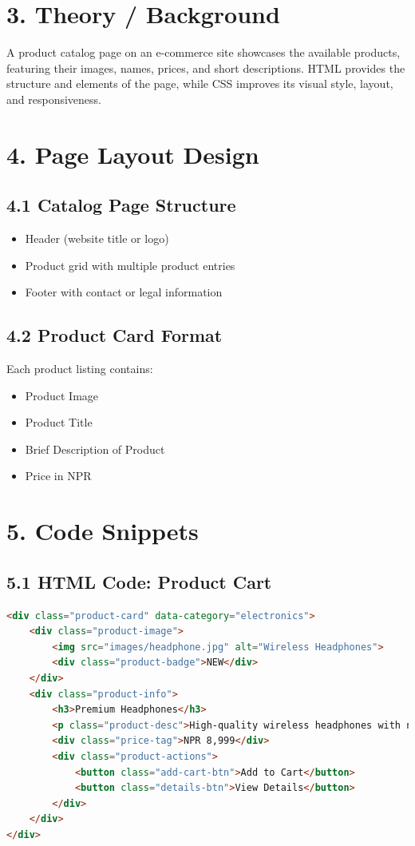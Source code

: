 \documentclass[a4paper,12pt]{article}
\begin{document}
\section*{3. Theory / Background}
A product catalog page on an e-commerce site showcases the available products, featuring their images, names, prices, and short descriptions. HTML provides the structure and elements of the page, while CSS improves its visual style, layout, and responsiveness.

\section*{4. Page Layout Design}
\subsection*{4.1 Catalog Page Structure}
\begin{itemize}
    \item Header (website title or logo)
    \item Product grid with multiple product entries
    \item Footer with contact or legal information
\end{itemize}

\subsection*{4.2 Product Card Format}
Each product listing contains:
\begin{itemize}
    \item Product Image
    \item Product Title
    \item Brief Description of Product
    \item Price in NPR
\end{itemize}

\section*{5. Code Snippets}
\subsection*{5.1 HTML Code: Product Cart }
\begin{lstlisting}[language=HTML]
<div class="product-card" data-category="electronics">
    <div class="product-image">
        <img src="images/headphone.jpg" alt="Wireless Headphones">
        <div class="product-badge">NEW</div>
    </div>
    <div class="product-info">
        <h3>Premium Headphones</h3>
        <p class="product-desc">High-quality wireless headphones with noise cancellation</p>
        <div class="price-tag">NPR 8,999</div>
        <div class="product-actions">
            <button class="add-cart-btn">Add to Cart</button>
            <button class="details-btn">View Details</button>
        </div>
    </div>
</div>

\end{lstlisting}
\end{document}
